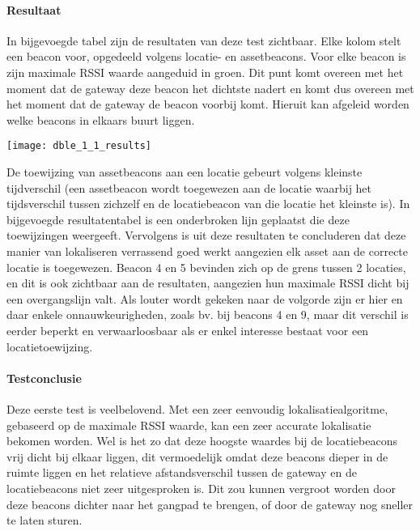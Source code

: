 \paragraph{Resultaat}
\begin{minipage}{0.42\textwidth}
In bijgevoegde tabel zijn de resultaten van deze test zichtbaar. Elke kolom stelt een beacon voor, opgedeeld volgens locatie- en assetbeacons. Voor elke beacon is zijn maximale RSSI waarde aangeduid in groen. Dit punt komt overeen met het moment dat de gateway deze beacon het dichtste nadert en komt dus overeen met het moment dat de gateway de beacon voorbij komt. Hieruit kan afgeleid worden welke beacons in elkaars buurt liggen. 
\end{minipage}
\hfill
\begin{minipage}{0.55\textwidth}
	\texttt{[image: dble\_1\_1\_results]}
	\label{fig:ond-ble-dynamic-1-1-res}
\end{minipage}

De toewijzing van assetbeacons aan een locatie gebeurt volgens kleinste tijdverschil (een assetbeacon wordt toegewezen aan de locatie waarbij het tijdsverschil tussen zichzelf en de locatiebeacon van die locatie het kleinste is). In bijgevoegde resultatentabel is een onderbroken lijn geplaatst die deze toewijzingen weergeeft.
Vervolgens is uit deze resultaten te concluderen dat deze manier van lokaliseren verrassend goed werkt aangezien elk asset aan de correcte locatie is toegewezen. Beacon 4 en 5 bevinden zich op de grens tussen 2 locaties, en dit is ook zichtbaar aan de resultaten, aangezien hun maximale RSSI dicht bij een overgangslijn valt. Als louter wordt gekeken naar de volgorde zijn er hier en daar enkele onnauwkeurigheden, zoals bv. bij beacons 4 en 9, maar dit verschil is eerder beperkt en verwaarloosbaar als er enkel interesse bestaat voor een locatietoewijzing.

\paragraph{Testconclusie}
Deze eerste test is veelbelovend. Met een zeer eenvoudig lokalisatiealgoritme, gebaseerd op de maximale RSSI waarde, kan een zeer accurate lokalisatie bekomen worden. Wel is het zo dat deze hoogste waardes bij de locatiebeacons vrij dicht bij elkaar liggen, dit vermoedelijk omdat deze beacons dieper in de ruimte liggen en het relatieve afstandsverschil tussen de gateway en de locatiebeacons niet zeer uitgesproken is. Dit zou kunnen vergroot worden door deze beacons dichter naar het gangpad te brengen, of door de gateway nog sneller te laten sturen.

